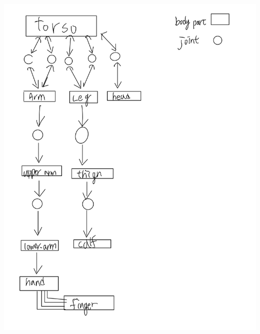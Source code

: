 \documentclass[a4,12pt]{article}
\begin{document}
    \includegraphics[scale=0.3]{scene_graph.jpg} 
\end{document}
